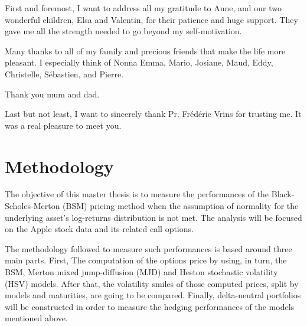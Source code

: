 \documentclass[12pt]{report}
\begin{document}
First and foremost, I want to address all my gratitude to Anne, and our two wonderful children, Elsa and Valentin, for their patience and huge support. They gave me all the strength needed to go beyond my self-motivation.

Many thanks to all of my family and precious friends that make the life more pleasant. I especially think of Nonna Emma, Mario, Josiane, Maud, Eddy, Christelle, Sébastien, and Pierre. 

Thank you mum and dad.

Last but not least, I want to sincerely thank Pr. Frédéric Vrins for trusting me. It was a real pleasure to meet you.




{
\tableofcontents
\clearpage

\listoffigures
 \clearpage
 
 
\listoftables}
\clearpage



%
%
\chapter{Methodology}
\label{cha:Methodology}

% 

The objective of this master thesis is to measure the performances of the Black-Scholes-Merton (BSM) pricing method when the assumption of normality for the underlying asset's log-returns distribution is not met.
The analysis will be focused on the Apple stock data and its related call options.

The methodology followed to measure such performances is based around three main parts. 
First, The computation of the options price by using, in turn, the BSM, Merton mixed jump-diffusion (MJD) and Heston stochastic volatility (HSV) models. 
After that, the volatility smiles of those computed prices, split by models and maturities, are going to be compared.
Finally, delta-neutral portfolios will be constructed in order to measure the hedging performances of the models mentioned above.
\end{document}
